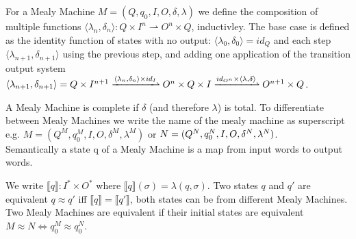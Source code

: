 \begin{definition}\label{def:composition}
 	For a Mealy Machine $M=(Q,q_0,I,O,\delta,\lambda)$ we define the composition of multiple functions $\langle\lambda_n,\delta_n\rangle:Q\times I^n\rightharpoonup O^n\times Q$, inductivley. The base case is defined as the identity function of states with no output: $\langle\lambda_0,\delta_0\rangle=id_Q$ and each step $\langle\lambda_{n+1},\delta_{n+1}\rangle$ using the previous step, and adding one application of the transition output system $\langle\lambda_{n+1},\delta_{n+1}\rangle =Q\times I^{n+1}\xrightharpoonup{\langle\lambda_n,\delta_n\rangle\times id_I}O^n\times Q\times I\xrightharpoonup{id_{O^n}\times\langle\lambda,\delta\rangle} O^{n+1}\times Q$.
 \end{definition} A Mealy Machine is complete if $\delta$ (and therefore $\lambda$) is total. To differentiate between Mealy Machines we write the name of the mealy machine as superscript e.g. $M=(Q^M,q_0^M,I,O,\delta^M,\lambda^M)$ or $N=(Q^N,q_0^N,\linebreak I,O,\delta^N,\lambda^N)$.\\
Semantically a state q of a Mealy Machine is a map from input words to output words. 
\begin{definition}\label{definition:semantics}
	 We write $\llbracket q\rrbracket:I^*\times O^*$ where $\llbracket q\rrbracket(\sigma)=\lambda(q,\sigma)$. Two states $q$ and $q'$ are equivalent $q\approx q'$ iff $\llbracket q\rrbracket=\llbracket q' \rrbracket$, both states can be from different Mealy Machines. Two Mealy Machines are equivalent if their initial states are equivalent $M\approx N\iff q_0^M\approx q_0^N$.
\end{definition}
